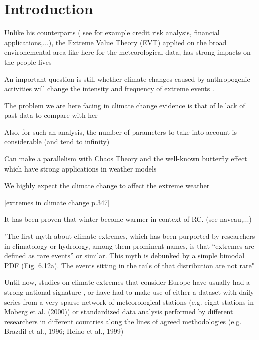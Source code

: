 \documentclass[11pt,a4paper,openany ]{book}
\newcommand\blankpage{%
    \null
    \thispagestyle{empty}%
    \addtocounter{page}{-1}%
    \newpage}
\begin{document}
\renewcommand\labelitemi{\normalsize$\bullet$}



\afterpage{\blankpage}


\chapter*{Introduction}
\thispagestyle{empty}



Unlike his counterparts ( see for example credit risk analysis, financial applications,...), the Extreme Value Theory (EVT) applied on the broad environemental area like here for the meteorological data, has strong impacts on the people lives 

An important question is still whether climate changes caused by anthropogenic activities will change the intensity and frequency of extreme events \cite{milly_climate_2008}.

The problem we are here facing in climate change evidence is that of le lack of past data to compare with her

Also, for such an analysis, the number of parameters to take into account is considerable (and tend to infinity)  

Can make a parallelism with Chaos Theory and the well-known butterfly effect which have strong applications in weather models\newline

We highly expect the climate change to affect the extreme weather  \newline

[extremes in climate change p.347]


It has been proven that winter become warmer in context of RC. (see naveau,...)


\cite{kharin_changes_2006}


"The first myth about climate extremes, which has been purported by
researchers in climatology or hydrology, among them prominent names, is that
“extremes are defined as rare events” or similar. This myth is debunked by a simple
bimodal PDF (Fig. 6.12a). The events sitting in the tails of that distribution are not
rare" \cite[pp.257]{mudelsee_climate_2014}
\newline

Until now, studies on climate extremes that consider Europe have usually had a strong national signature
, or have had to make use of either a
dataset with daily series from a very sparse network of meteorological stations (e.g. eight stations in Moberg
et al. (2000)) or standardized data analysis performed by different researchers in different countries along the
lines of agreed methodologies (e.g. Brazdil et al., 1996; Heino et al., 1999) \cite{klein_tank_daily_2002}
\end{document}
